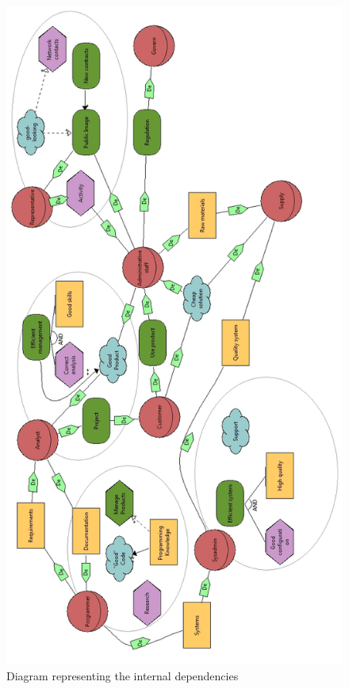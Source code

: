 \begin{figure}[!ht]
\centering
\includegraphics[scale=0.40]{Si_star/img/internal_goals_dependencies}
\caption{Diagram representing the internal dependencies}
\label{img:motiv2}
\end{figure}
